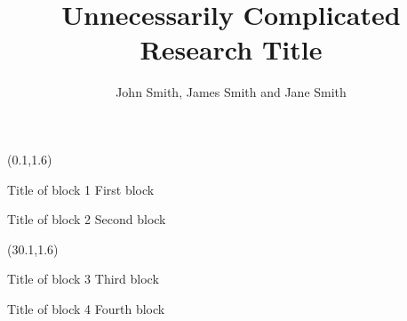 \documentclass{beamer}
\title{Unnecessarily Complicated Research Title} %
\author{John Smith, James Smith and Jane Smith} %
\institute{Department and University Name} %
\begin{document}
\maketitle

\begin{textblock}{30}(0.1,1.6)
	\begin{block}{Title of block 1}
		First block
	\end{block}
	\begin{block}{Title of block 2}
		Second block
	\end{block}
\end{textblock}

\begin{textblock}{30}(30.1,1.6)
	\begin{block}{Title of block 3}
		Third block
	\end{block}
	\begin{block}{Title of block 4}
		Fourth block
	\end{block}
\end{textblock}
\end{document}
